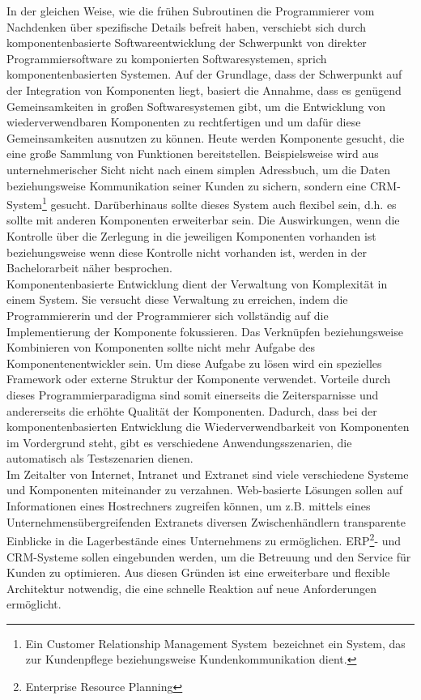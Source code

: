 In der gleichen Weise, wie die frühen Subroutinen die Programmierer vom Nachdenken über spezifische Details befreit haben, verschiebt sich durch komponentenbasierte Softwareentwicklung der Schwerpunkt von direkter Programmiersoftware zu komponierten Softwaresystemen, sprich komponentenbasierten Systemen. Auf der Grundlage, dass der Schwerpunkt auf der Integration von Komponenten liegt, basiert die Annahme, dass es genügend Gemeinsamkeiten in  großen Softwaresystemen gibt, um die Entwicklung von wiederverwendbaren Komponenten zu rechtfertigen und um dafür diese Gemeinsamkeiten ausnutzen zu können. Heute werden Komponente gesucht, die eine große Sammlung von Funktionen bereitstellen. Beispielsweise wird aus unternehmerischer Sicht nicht nach einem simplen Adressbuch, um die Daten beziehungsweise Kommunikation seiner Kunden zu sichern, sondern eine CRM-System\footnote{Ein \glqq Customer Relationship Management System\grqq\ bezeichnet ein System, das zur Kundenpflege beziehungsweise Kundenkommunikation dient.} gesucht. Darüberhinaus sollte dieses System auch flexibel sein, d.h. es sollte mit anderen Komponenten erweiterbar sein. Die Auswirkungen, wenn die Kontrolle über die Zerlegung in die jeweiligen Komponenten vorhanden ist beziehungsweise wenn diese Kontrolle nicht vorhanden ist, werden in der Bachelorarbeit näher besprochen\citereset \autocite{Andresen.2003}. \\
Komponentenbasierte Entwicklung dient der Verwaltung von Komplexität in einem System. Sie versucht diese Verwaltung zu erreichen, indem die Programmiererin und der Programmierer sich vollständig auf die Implementierung der Komponente fokussieren. Das Verknüpfen beziehungsweise Kombinieren von Komponenten sollte nicht mehr Aufgabe des Komponentenentwickler sein. Um diese Aufgabe zu lösen wird ein spezielles Framework oder externe Struktur der Komponente verwendet. Vorteile durch dieses Programmierparadigma sind somit einerseits die Zeitersparnisse und andererseits die erhöhte Qualität der Komponenten. Dadurch, dass bei der komponentenbasierten Entwicklung die Wiederverwendbarkeit von Komponenten im Vordergrund steht, gibt es verschiedene Anwendungsszenarien, die automatisch als Testszenarien dienen\citereset \autocite{Andresen.2003}.\\
Im Zeitalter von Internet, Intranet und Extranet sind viele verschiedene Systeme und Komponenten miteinander zu verzahnen. Web-basierte Lösungen sollen auf Informationen eines Hostrechners zugreifen können, um z.B. mittels eines Unternehmensübergreifenden Extranets diversen Zwischenhändlern transparente Einblicke in die Lagerbestände eines Unternehmens zu ermöglichen. ERP\footnote{Enterprise Resource Planning}- und CRM-Systeme sollen eingebunden werden, um die Betreuung und den Service für Kunden zu optimieren. Aus diesen Gründen ist eine erweiterbare und flexible Architektur notwendig, die eine schnelle Reaktion auf neue Anforderungen ermöglicht.\\
